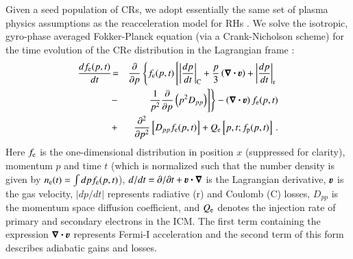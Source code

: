 \documentclass[fleqn,usenatbib,useAMS]{mnras}
\newcommand{\bcdot}{\ensuremath{%
  \mathchoice%
   {\mskip\thinmuskip\lower0.2ex\hbox{\scalebox{1.5}{$\cdot$}}\mskip\thinmuskip}}%
   {\mskip\thinmuskip\lower0.2ex\hbox{\scalebox{1.5}{$\cdot$}}\mskip\thinmuskip}%
   {\lower0.3ex\hbox{\scalebox{1.2}{$\cdot$}}}%
   {\lower0.3ex\hbox{\scalebox{1.2}{$\cdot$}}}%
}
\newcommand{\bvel}{\ensuremath{\boldsymbol{\varv}}}
\newcommand{\bnabla}{\ensuremath{\boldsymbol{\nabla}}}
\begin{document}
Given a seed population of CRs, we adopt essentially the same set of
plasma physics assumptions as the reacceleration model for RHs
\citep{brunetti07,brunetti11}. We solve the isotropic, gyro-phase
averaged Fokker-Planck equation (via a Crank-Nicholson scheme) for the
time evolution of the CRe distribution in the Lagrangian frame
\citep{brunetti07,brunetti11}:
\begin{eqnarray}
{{d f_{\rmn{e}}(p,t)}\over{d t}} &\!=&
\frac{\partial}{\partial p}
\left\{
f_{\rmn{e}}(p,t)\left[
\left|{{dp}\over{dt}}\right|_{\rm C} 
+ \frac{p}{3}\left(\bnabla\bcdot \bvel\right)
+ \left|{{dp}\over{dt}}\right|_{\rm r}\right.\right.
\nonumber\\
&-& \left.\left.{1\over{p^2}}{{\partial }\over{\partial p}}\left(p^2 D_{pp}\right) 
\right]\right\} - \left(\bnabla\bcdot \bvel\right) f_{\rmn{e}}(p,t)
\nonumber\\
&+& {{\partial^2 }\over{\partial p^2}}
\left[
D_{pp} f_{\rmn{e}}(p,t) \right]+ Q_{\rmn{e}}\left[p,t;f_{\rmn{p}}(p,t)\right]   \, .
\label{elettroni}
\end{eqnarray}
Here $f_{{\mathrm{e}}}$ is the one-dimensional distribution in position $x$
(suppressed for clarity), momentum $p$ and time $t$ (which is
normalized such that the number density is given by
$n_{{\mathrm{e}}}(t)=\int d p f_{{\mathrm{e}}}(p,t)$), $d/dt=\partial/\partial
t+\bvel\bcdot\bnabla$ is the Lagrangian derivative, $\bvel$ is the gas
velocity, $|dp/dt|$ represents radiative (r) and Coulomb (C)
losses, $D_{pp}$ is the momentum space diffusion coefficient, and
$Q_{{\mathrm{e}}}$ denotes the injection rate of primary and secondary
electrons in the ICM. The first term containing the expression
$\bnabla\bcdot \bvel$ represents Fermi-I acceleration and the second
term of this form describes adiabatic gains and losses.
\end{document}
